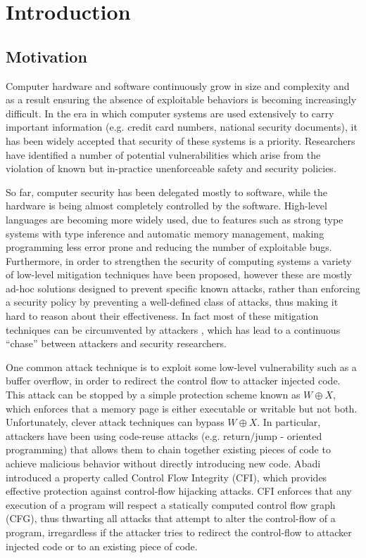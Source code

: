 \chapter{Introduction}\label{ch:introduction}

\section{Motivation}\label{sec:motivation}

Computer hardware and software continuously grow in size and complexity and as a
result ensuring the absence of exploitable behaviors is becoming increasingly
difficult. In the era in which computer systems are used extensively to
carry important information (e.g. credit card numbers, national security
documents), it has been widely accepted that security of these systems is a
priority. Researchers have identified a number of potential vulnerabilities
which arise from the violation of known but in-practice unenforceable safety
and security policies.

So far, computer security has been delegated mostly to software, while
the hardware is being almost completely controlled by the software.
High-level languages are becoming more widely used, due to features
such as strong type systems with type inference and automatic memory
management, making programming less error prone and reducing the
number of exploitable bugs. Furthermore, in order to strengthen the
security of computing systems a variety of low-level mitigation
techniques \cite{Cowan:1998:SAA:1267549.1267554,PaX,Erlingsson07}
have been proposed, however these are mostly ad-hoc solutions designed
to prevent specific known attacks, rather than enforcing a security
policy by preventing a well-defined class of attacks, thus making it
hard to reason about their effectiveness. In fact most of these
mitigation techniques can be circumvented by attackers
\cite{Szekeres2013}, which has lead to a continuous ``chase'' between
attackers and security researchers.

One common attack technique is to exploit some low-level vulnerability
such as a buffer overflow, in order to redirect the control flow to
attacker injected code. This attack can be stopped by a simple
protection scheme known as $W \oplus X$, which enforces that a memory
page is either executable or writable but not both.  Unfortunately,
clever attack techniques can bypass $W \oplus X$. In particular,
attackers have been using code-reuse attacks (e.g. return/jump -
oriented programming) that allows them to chain together existing
pieces of code to achieve malicious behavior without directly
introducing new code.  Abadi~\ETAL\cite{abadi2005} introduced a
property called Control Flow Integrity (CFI), which provides effective
protection against control-flow hijacking attacks. CFI enforces that
any execution of a program will respect a statically computed control
flow graph (CFG), thus thwarting all attacks that attempt to alter
the control-flow of a program, irregardless if the attacker
tries to redirect the control-flow to attacker injected code or
to an existing piece of code. 


